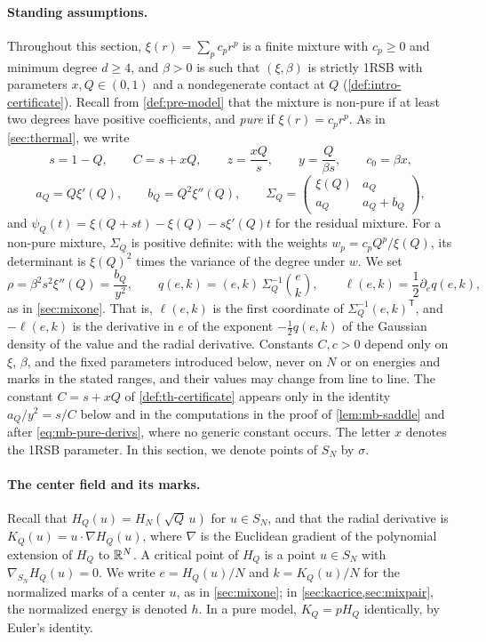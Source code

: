 \paragraph{Standing assumptions.}
Throughout this section, $\xi(r)=\sum_pc_pr^p$ is a finite mixture with $c_p\ge0$ and minimum degree $d\ge4$, and $\beta>0$ is such that $(\xi,\beta)$ is strictly 1RSB with parameters $x,Q\in(0,1)$ and a nondegenerate contact at $Q$ (\cref{def:intro-certificate}). Recall from \cref{def:pre-model} that the mixture is non-pure if at least two degrees have positive coefficients, and \emph{pure} if $\xi(r)=c_pr^p$. As in \cref{sec:thermal}, we write
\[
s=1-Q,\qquad C=s+xQ,\qquad z=\frac{xQ}{s},\qquad y=\frac{Q}{\beta s},\qquad c_0=\beta x,
\]
\[
a_Q=Q\xi'(Q),\qquad b_Q=Q^2\xi''(Q),\qquad \Sigma_Q=\begin{pmatrix}\xi(Q)&a_Q\\a_Q&a_Q+b_Q\end{pmatrix},
\]
and $\psi_Q(t)=\xi(Q+st)-\xi(Q)-s\xi'(Q)t$ for the residual mixture.
For a non-pure mixture, $\Sigma_Q$ is positive definite: with the weights $w_p=c_pQ^p/\xi(Q)$, its determinant is $\xi(Q)^2$ times the variance of the degree under $w$. We set
\begin{equation}\label{eq:mb-mu}
\rho=\beta^2s^2\xi''(Q)=\frac{b_Q}{y^2},\qquad q(e,k)=(e,k)\,\Sigma_Q^{-1}\binom ek,\qquad \ell(e,k)=\frac12\partial_eq(e,k),
\end{equation}
as in \cref{sec:mixone}. That is, $\ell(e,k)$ is the first coordinate of $\Sigma_Q^{-1}(e,k)^{\mathsf T}$, and $-\ell(e,k)$ is the derivative in $e$ of the exponent $-\frac12q(e,k)$ of the Gaussian density of the value and the radial derivative.
Constants $C,c>0$ depend only on $\xi$, $\beta$, and the fixed parameters introduced below, never on $N$ or on energies and marks in the stated ranges, and their values may change from line to line. The constant $C=s+xQ$ of \cref{def:th-certificate} appears only in the identity $a_Q/y^2=s/C$ below and in the computations in the proof of \cref{lem:mb-saddle} and after \eqref{eq:mb-pure-derivs}, where no generic constant occurs. The letter $x$ denotes the 1RSB parameter. In this section, we denote points of $S_N$ by $\sigma$.

\paragraph{The center field and its marks.}
Recall that $H_Q(u)=H_N(\sqrt Q\,u)$ for $u\in S_N$, and that the radial derivative is $K_Q(u)=u\cdot\nabla H_Q(u)$, where $\nabla$ is the Euclidean gradient of the polynomial extension of $H_Q$ to $\mathbb R^N$. A critical point of $H_Q$ is a point $u\in S_N$ with $\nabla_{S_N}H_Q(u)=0$. We write $e=H_Q(u)/N$ and $k=K_Q(u)/N$ for the normalized marks of a center $u$, as in \cref{sec:mixone}; in \cref{sec:kacrice,sec:mixpair}, the normalized energy is denoted $h$. In a pure model, $K_Q=pH_Q$ identically, by Euler's identity.

